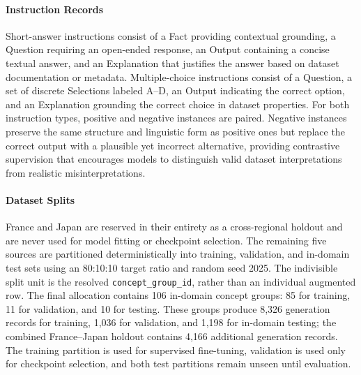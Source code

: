 \documentclass[a4paper,fleqn]{cas-sc}
\begin{document}
\paragraph{Instruction Records}
Short-answer instructions consist of a Fact providing contextual grounding, a Question requiring an open-ended response, an Output containing a concise textual answer, and an Explanation that justifies the answer based on dataset documentation or metadata.
Multiple-choice instructions consist of a Question, a set of discrete Selections labeled A–D, an Output indicating the correct option, and an Explanation grounding the correct choice in dataset properties. For both instruction types, positive and negative instances are paired.  Negative instances preserve the same structure and linguistic form as positive ones but replace the correct output with a plausible yet incorrect alternative, providing contrastive supervision that encourages models to distinguish valid dataset interpretations from realistic misinterpretations.

\paragraph{Dataset Splits}
France and Japan are reserved in their entirety as a cross-regional holdout and are never used for model fitting or checkpoint selection. The remaining five sources are partitioned deterministically into training, validation, and in-domain test sets using an 80:10:10 target ratio and random seed 2025. The indivisible split unit is the resolved \texttt{concept\_group\_id}, rather than an individual augmented row. The final allocation contains 106 in-domain concept groups: 85 for training, 11 for validation, and 10 for testing. These groups produce 8,326 generation records for training, 1,036 for validation, and 1,198 for in-domain testing; the combined France--Japan holdout contains 4,166 additional generation records. The training partition is used for supervised fine-tuning, validation is used only for checkpoint selection, and both test partitions remain unseen until evaluation.
\end{document}
